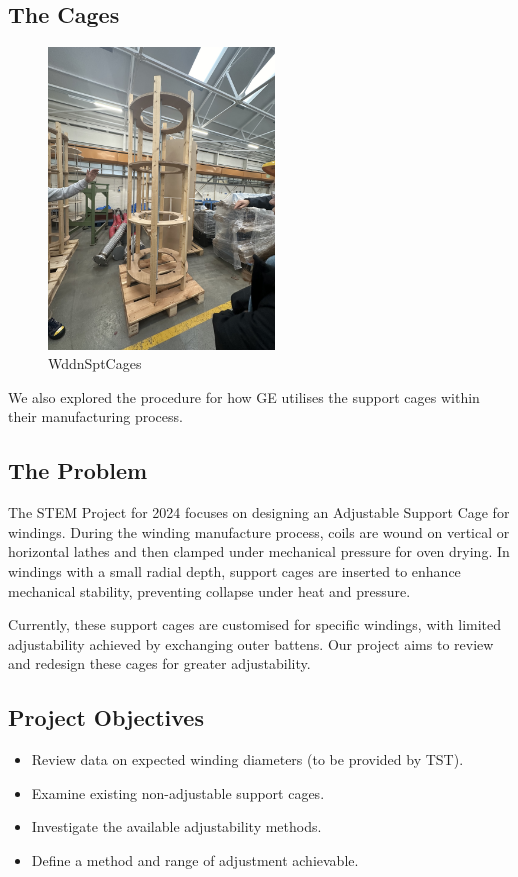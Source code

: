 \documentclass[a4paper,10pt]{article}
\begin{document}
\subsection{The Cages}
\begin{figure}[H]
  \centering
  \includegraphics[width=6cm, angle=270]{wooden-support-cage}
  \caption{\gls{WddnSptCages}}
  \label{fig:wooden-support-cage}
\end{figure}

We also explored the procedure for how \gls{GE} utilises the support cages within their manufacturing process.

\subsection{The Problem}
The STEM Project for 2024 focuses on designing an Adjustable Support Cage for windings. During the winding manufacture process, coils are wound on vertical or horizontal lathes and then clamped under mechanical pressure for oven drying. In windings with a small radial depth, support cages are inserted to enhance mechanical stability, preventing collapse under heat and pressure.

Currently, these support cages are customised for specific windings, with limited adjustability achieved by exchanging outer battens. Our project aims to review and redesign these cages for greater adjustability.

\subsection{Project Objectives}
\begin{itemize}
  \item Review data on expected winding diameters (to be provided by TST).
  \item Examine existing non-adjustable support cages.
  \item Investigate the available adjustability methods.
  \item Define a method and range of adjustment achievable.
\end{itemize}
\end{document}
